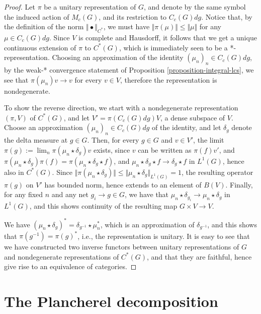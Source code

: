 \begin{proof}
Let $\pi$ be a unitary representation of $G$, and denote by the same symbol the induced action of $M_c(G)$, and its restriction to $C_c(G)dg$. Notice that, by the definition of the norm $\Vert\bullet\Vert_{C^*}$, we must have $\Vert \pi(\mu)\Vert\leq \Vert\mu\Vert$ for any $\mu\in C_c(G)dg$. Since $V$ is complete and Hausdorff, it follows that we get a unique continuous extension of $\pi$ to $C^*(G)$, which is immediately seen to be a *-representation. Choosing an approximation of the identity $(\mu_n)_n \in C_c(G)dg$, by the weak-* convergence statement of Proposition \ref{proposition-integral-lcs}, we see that $\pi(\mu_n) v \to v$ for every $v\in V$, therefore the representation is nondegenerate. 

To show the reverse direction, we start with a nondegenerate representation $(\pi, V)$ of $C^*(G)$, and let $V' =\pi(C_c(G)dg)V$, a dense subspace of $V$. Choose an approximation $(\mu_n)_n \in C_c(G)dg$ of the identity, and let $\delta_g$ denote the delta measure at $g\in G$. Then, for every $g\in G$ and $v\in V'$, the limit $\pi(g):=\lim_n \pi(\mu_n\star \delta_g) v$ exists, since $v$ can be written as $\pi(f)v'$, and $\pi(\mu_n\star \delta_g) \pi(f) = \pi(\mu_n\star \delta_g \star f)$, and $\mu_n\star \delta_g \star f \to \delta_g \star f$ in $L^1(G)$, hence also in $C^*(G)$. Since $\Vert \pi(\mu_n\star \delta_g)\Vert \le \Vert \mu_n\star \delta_g\Vert_{L^1(G)} = 1$, the resulting operator $\pi(g)$ on $V'$ has bounded norm, hence extends to an element of $B(V)$.  Finally, for any fixed $n$ and any net $g_i\to g \in G$, we have that $\mu_n\star \delta_{g_i} \to \mu_n\star \delta_g$ in $L^1(G)$, and this shows continuity of the resulting map $G\times V\to V$. 

We have $(\mu_n\star \delta_g)^* = \delta_{g^{-1}} \star \mu_n^*$, which is an approximation of $\delta_{g^{-1}}$, and this shows that $\pi(g^{-1}) = \pi(g)^*$, i.e., the representation is unitary. It is easy to see that we have constructed two inverse functors between unitary representations of $G$ and nondegenerate representations of $C^*(G)$, and that they are faithful, hence give rise to an equivalence of categories.
\end{proof}



\section{The Plancherel decomposition}
\label{section-Plancherel}

